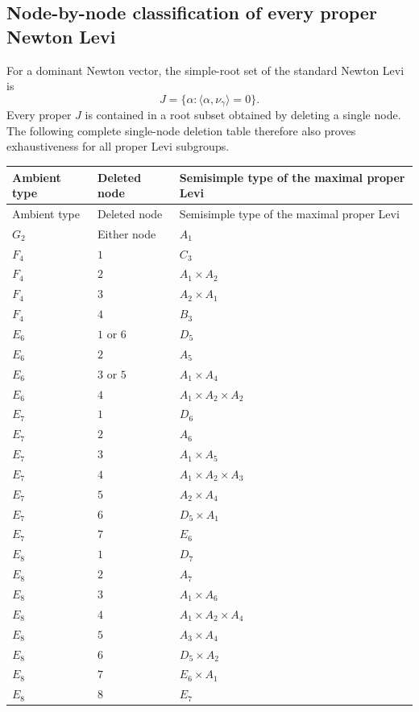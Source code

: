\documentclass[11pt,a4paper]{article}
\theoremstyle{definition}
\theoremstyle{remark}
\begin{document}
\subsection{Node-by-node classification of every proper Newton Levi}
\label{subsec:ex-levi-table}

For a dominant Newton vector, the simple-root set of the standard Newton
Levi is
\[
J=\{\alpha:\langle\alpha,\nu_\gamma\rangle=0\}.
\]
Every proper \(J\) is contained in a root subset obtained by deleting a
single node.
The following complete single-node deletion table therefore also proves
exhaustiveness for all proper Levi subgroups.

\begin{longtable}{@{}lll@{}}
\toprule
Ambient type & Deleted node & Semisimple type of the maximal proper Levi\\
\midrule
\endfirsthead
\toprule
Ambient type & Deleted node & Semisimple type of the maximal proper Levi\\
\midrule
\endhead
\(G_2\) & Either node & \(A_1\)\\
\(F_4\) & \(1\) & \(C_3\)\\
\(F_4\) & \(2\) & \(A_1\times A_2\)\\
\(F_4\) & \(3\) & \(A_2\times A_1\)\\
\(F_4\) & \(4\) & \(B_3\)\\
\(E_6\) & \(1\) or \(6\) & \(D_5\)\\
\(E_6\) & \(2\) & \(A_5\)\\
\(E_6\) & \(3\) or \(5\) & \(A_1\times A_4\)\\
\(E_6\) & \(4\) & \(A_1\times A_2\times A_2\)\\
\(E_7\) & \(1\) & \(D_6\)\\
\(E_7\) & \(2\) & \(A_6\)\\
\(E_7\) & \(3\) & \(A_1\times A_5\)\\
\(E_7\) & \(4\) & \(A_1\times A_2\times A_3\)\\
\(E_7\) & \(5\) & \(A_2\times A_4\)\\
\(E_7\) & \(6\) & \(D_5\times A_1\)\\
\(E_7\) & \(7\) & \(E_6\)\\
\(E_8\) & \(1\) & \(D_7\)\\
\(E_8\) & \(2\) & \(A_7\)\\
\(E_8\) & \(3\) & \(A_1\times A_6\)\\
\(E_8\) & \(4\) & \(A_1\times A_2\times A_4\)\\
\(E_8\) & \(5\) & \(A_3\times A_4\)\\
\(E_8\) & \(6\) & \(D_5\times A_2\)\\
\(E_8\) & \(7\) & \(E_6\times A_1\)\\
\(E_8\) & \(8\) & \(E_7\)\\
\bottomrule
\end{longtable}
\end{document}
